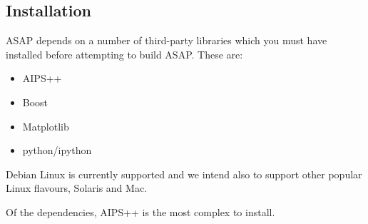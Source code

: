 \documentclass[11pt]{article}
\begin{document}
\subsection{Installation}

ASAP depends on a number of third-party libraries which you must
have installed before attempting to build ASAP. These are:

\begin{itemize}
\item AIPS++
\item Boost
\item Matplotlib
\item python/ipython
\end{itemize}

Debian Linux is currently supported and we intend also
to support other popular Linux flavours, Solaris and Mac.

Of the dependencies, AIPS++ is the most complex to install.

\printindex
\end{document}
